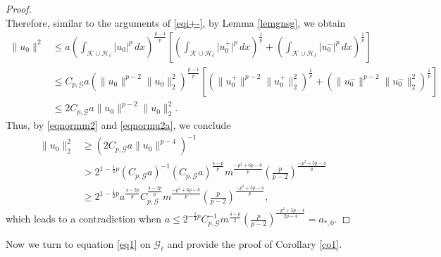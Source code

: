 \documentclass[11pt]{amsart}
\newcommand{\abs}[1]{\lvert#1\rvert}
\newcommand{\norm}[1]{\lVert#1\rVert}
\newcommand{\G}{\mathcal{G}}
\newcommand{\K}{\mathcal{K}}
\numberwithin{equation}{section}
\begin{document}
\begin{proof}
\begin{equation}
\end{equation}
Therefore, similar to the arguments of \eqref{eqi+-}, by Lemma \ref{lemgnsg}, we obtain
\begin{equation}
    \begin{aligned}\label{eqnormu2a}
\norm{u_{{0}}}^2 & \leq a (\int_{\K\cup\mathcal{H}_\ell}\abs{u_{{0}}}^p\, dx)^\frac{p-1}{p}\left[(\int_{\K\cup\mathcal{H}_\ell}\abs{u_{{0}}^+}^p\, dx)^\frac{1}{p} + (\int_{\K\cup\mathcal{H}_\ell}\abs{u_{{0}}^-}^p\, dx)^\frac{1}{p}\right] \\
& \leq C_{p,\G}a(\norm{u_{0}}^{p-2}\norm{u_{0}}_2^2)^\frac{p-1}{p}\left[(\norm{u_{0}^+}^{p-2}\norm{u_{0}^+}_2^2)^\frac{1}{p} + (\norm{u_{0}^-}^{p-2}\norm{u_{0}^-}_2^2)^\frac{1}{p}\right]\\
& \leq 2C_{p,\G}a\norm{u_{0}}^{p-2}\norm{u_{0}}_2^2.
\end{aligned}
\end{equation}
Thus, by \eqref{eqnormm2} and \eqref{eqnormu2a}, we conclude
\[
\begin{aligned}
        \norm{u_{0}}_2^2 &\geq (2C_{p,\G}a\norm{u_{0}}^{p-4})^{-1}\\
        & > 2^{1-\frac{1}{2}p}(C_{p,\G}a)^{-1}(C_{p,\G}a)^\frac{4-p}{p} m^\frac{-p^2+6p-8}{p}\left(\frac{p}{p-2}\right)^\frac{-p^2+5p-4}{p}\\
        & \geq 2^{1-\frac{1}{2}p}a^\frac{4-2p}{p}C_{p,\G}^\frac{4-2p}{p}m^\frac{-p^2+6p-8}{p}\left(\frac{p}{p-2}\right)^\frac{-p^2+5p-4}{p},
\end{aligned}
\]
which leads to a contradiction when $a \leq 2^{-\frac{1}{4}p}C_{p,\G}^{-1}m^\frac{4-p}{2}\left(\frac{p}{p-2}\right)^\frac{-p^2+5p-4}{2p-4} = a_{*,0}$.
\end{proof}
Now we turn to equation \eqref{eq1} on $\G_\ell$ and provide the proof of Corollary \ref{co1}.
\end{document}

